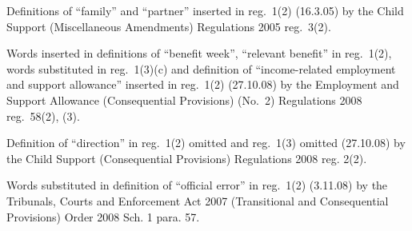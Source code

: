 \documentclass[a4paper,12pt]{article}
\begin{document}
{%
%
%
%
%

Definitions of ``family'' and ``partner'' inserted in reg.~1(2) (16.3.05) by the Child Support (Miscellaneous Amendments) Regulations 2005 reg.~3(2).

Words inserted in definitions of ``benefit week'', ``relevant benefit'' in reg.~1(2), words substituted in reg.~1(3)(c) and definition of ``income-related employment and support allowance'' inserted in reg.~1(2)
(27.10.08) by the Employment and Support Allowance (Consequential Provisions) (No.~2) Regulations 2008 reg.~58(2), (3).

Definition of ``direction'' in reg.~1(2) omitted and reg.~1(3) omitted (27.10.08) by the Child Support (Consequential Provisions) Regulations 2008 reg. 2(2).

Words substituted in definition of ``official error'' in reg.~1(2) (3.11.08) by the Tribunals, Courts and Enforcement Act 2007 (Transitional and Consequential Provisions) Order 2008 Sch. 1 para. 57.
}
\end{document}
